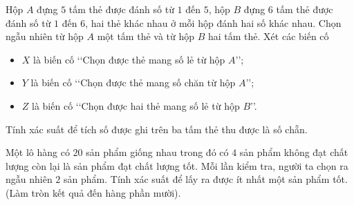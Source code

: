 \begin{ex}%
	Hộp $A$ đựng $5$ tấm thẻ được đánh số từ $1$ đến $5$, hộp $B$ đựng $6$ tấm thẻ được đánh số từ $1$ đến $6$, hai thẻ khác nhau ở mỗi hộp đánh hai số khác nhau. Chọn ngẫu nhiên từ hộp $A$ một tấm thẻ và từ hộp $B$ hai tấm thẻ. Xét các biến cố
	\begin{itemize}
		\item $X$ là biến cố \lq\lq Chọn được thẻ mang số lẻ từ hộp $A$\rq\rq;
		\item $Y$ là biến cố \lq\lq Chọn được thẻ mang số chăn từ hộp $A$\rq\rq;
		\item $Z$ là biến cố \lq\lq Chọn được hai thẻ mang số lẻ từ hộp $B$\rq\rq.
	\end{itemize}
	Tính xác suất để tích số được ghi trên ba tấm thẻ thu được là số chẵn.
\end{ex}

\begin{ex}%
	Một lô hàng có $20$ sản phẩm giống nhau trong đó có $4$ sản phẩm không đạt chất lượng còn lại là sản phẩm đạt chất lượng tốt. Mỗi lần kiểm tra, người ta chọn ra ngẫu nhiên $2$ sản phẩm. Tính xác suất để lấy ra được ít nhất một sản phẩm tốt. (Làm tròn kết quả đến hàng phần mười).
\end{ex}


